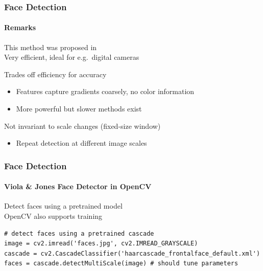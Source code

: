 \documentclass[xetex,professionalfont]{beamer}
\begin{document}
\begin{frame}
\frametitle{Face Detection}
\framesubtitle{Remarks}

This method was proposed in \cite{viola2001} \\
Very efficient, ideal for e.g.\ digital cameras

\bigskip
Trades off efficiency for accuracy
\begin{itemize}
    \item Features capture gradients coarsely, no color information
    \item More powerful but slower methods exist
\end{itemize}

\bigskip
Not invariant to scale changes (fixed-size window)
\begin{itemize}
    \item Repeat detection at different image scales
\end{itemize}

\end{frame}


\begin{frame}[fragile]
\frametitle{Face Detection}
\framesubtitle{Viola \& Jones Face Detector in OpenCV}

Detect faces using a pretrained model \\
OpenCV also supports training

\bigskip
\small
\begin{verbatim}
# detect faces using a pretrained cascade
image = cv2.imread('faces.jpg', cv2.IMREAD_GRAYSCALE)
cascade = cv2.CascadeClassifier('haarcascade_frontalface_default.xml')
faces = cascade.detectMultiScale(image) # should tune parameters
\end{verbatim}

\end{frame}


{
\begin{frame}


\end{frame}
}
\end{document}
